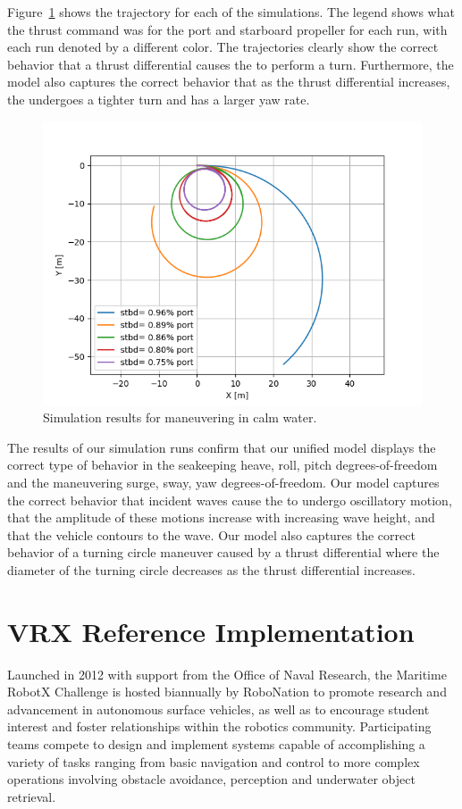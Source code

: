 \documentclass[utf8]{frontiersSCNS} %
\begin{document}
Figure~\ref{f:manuevering} shows the \wamv{} trajectory for each of the simulations. The legend shows what the thrust command was for the port and starboard propeller for each run, with each run denoted by a different color. The trajectories clearly show the correct behavior that a thrust differential causes the \wamv{} to perform a turn. Furthermore, the model also captures the correct behavior that as the thrust differential increases, the \wamv{} undergoes a tighter turn and has a larger yaw rate.
\begin{figure}[h]
  \centering
  \includegraphics[width=\SFc\textwidth]{images/2020_08_25_manuevering_000.png}
  \caption{Simulation results for maneuvering in calm water.}
  \label{f:manuevering}
\end{figure}

The results of our simulation runs confirm that our unified model displays the correct type of behavior in the seakeeping heave, roll, pitch degrees-of-freedom and the maneuvering surge, sway, yaw degrees-of-freedom. Our model captures the correct behavior that incident waves cause the \wamv{} to undergo oscillatory motion, that the amplitude of these motions increase with increasing wave height, and that the vehicle contours to the wave. Our model also captures the correct behavior of a turning circle maneuver caused by a thrust differential where the diameter of the turning circle decreases as the thrust differential increases.\color{black}
%
\section{VRX Reference Implementation}
%
Launched in 2012 with support from the Office of Naval Research, the Maritime RobotX Challenge is hosted biannually by RoboNation to promote research and advancement in autonomous surface vehicles, as well as to encourage student interest and foster relationships within the robotics community. Participating teams compete to design and implement systems capable of accomplishing a variety of tasks ranging from basic navigation and control to more complex operations involving obstacle avoidance, perception and underwater object retrieval.
\end{document}
